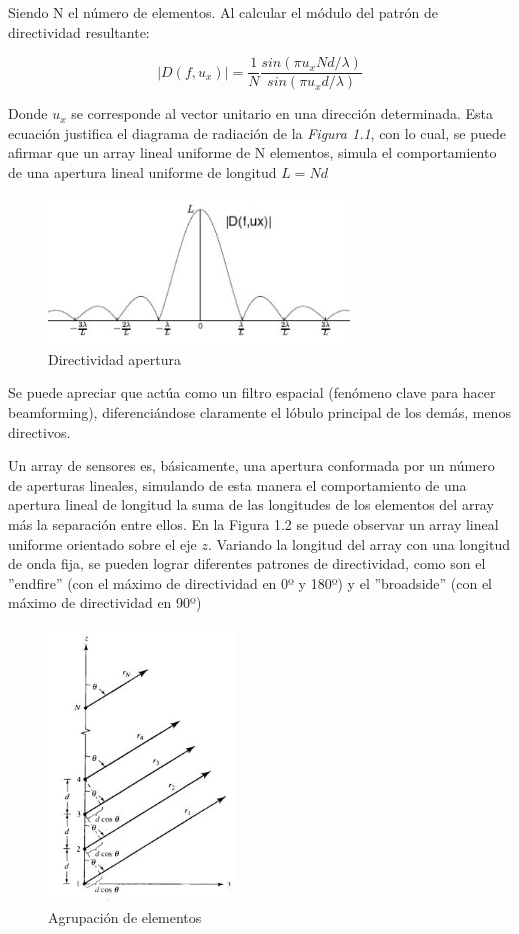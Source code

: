\documentclass[a4paper,11pt]{book}
\begin{document}
Siendo N el número de elementos. Al calcular el módulo del patrón de directividad resultante:

	\begin{equation}
|D(f, u_x)| =\frac{1}{N}\frac{sin(\pi u_{x} N d / \lambda)}{sin(\pi u_{x} d / \lambda)}
	\end{equation}
	
Donde $u_x$ se corresponde al vector unitario en una dirección determinada. Esta ecuación justifica el diagrama de radiación de la \textit{Figura 1.1}, con lo cual, se puede afirmar que un array lineal uniforme de N elementos, simula el comportamiento de una apertura lineal uniforme de longitud $L = Nd$
	
	\begin{figure}[hbtp]
	\centering
	\includegraphics[width = 8cm]{FIGURAS/directividad_apertura.JPG}
	\caption{Directividad apertura}
	\end{figure}
	
	 Se puede apreciar que actúa como un filtro espacial (fenómeno clave para hacer beamforming), diferenciándose claramente el lóbulo principal de los demás, menos directivos.
	 
	 Un array de sensores es, básicamente, una apertura conformada por un número de aperturas lineales, simulando de esta manera el comportamiento de una apertura lineal de longitud la suma de las longitudes de los elementos del array más la separación entre ellos. En la Figura 1.2 se puede observar un array lineal uniforme orientado sobre el eje $z$. Variando la longitud del array con una longitud de onda fija, se pueden lograr diferentes patrones de directividad, como son el ''endfire'' (con el máximo de directividad en 0º y 180º) y el ''broadside'' (con el máximo de directividad en 90º)
	 \begin{figure}[hbtp]
	 \centering
	 \includegraphics[width = 5cm]{FIGURAS/array_elementos.JPG}
	 \caption{Agrupación de elementos}
	 \end{figure}
	 
\end{document}
